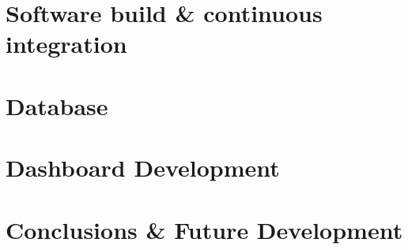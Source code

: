 \documentclass[a4paper,12pt,twoside]{report}
\begin{document}
\chapter{Software build \& continuous integration}
	

% 	

\chapter{Database}


\chapter{Dashboard Development}


\chapter{Conclusions \& Future Development}





\cleardoublepage


\listoffigures
\end{document}
